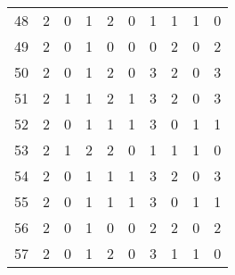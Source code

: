 \begin{longtable}{cp{1.5cm}p{1.5cm}p{1.5cm}p{1.5cm}p{1.5cm}p{1.5cm}p{1.5cm}p{1.5cm}p{1.5cm}}
48 &                      2 &                      0 &                      1 &                         2 &                         0 &                         1 &                      1 &                      1 &                      0 \\
49 &                      2 &                      0 &                      1 &                         0 &                         0 &                         0 &                      2 &                      0 &                      2 \\
50 &                      2 &                      0 &                      1 &                         2 &                         0 &                         3 &                      2 &                      0 &                      3 \\
51 &                      2 &                      1 &                      1 &                         2 &                         1 &                         3 &                      2 &                      0 &                      3 \\
52 &                      2 &                      0 &                      1 &                         1 &                         1 &                         3 &                      0 &                      1 &                      1 \\
53 &                      2 &                      1 &                      2 &                         2 &                         0 &                         1 &                      1 &                      1 &                      0 \\
54 &                      2 &                      0 &                      1 &                         1 &                         1 &                         3 &                      2 &                      0 &                      3 \\
55 &                      2 &                      0 &                      1 &                         1 &                         1 &                         3 &                      0 &                      1 &                      1 \\
56 &                      2 &                      0 &                      1 &                         0 &                         0 &                         2 &                      2 &                      0 &                      2 \\
57 &                      2 &                      0 &                      1 &                         2 &                         0 &                         3 &                      1 &                      1 &                      0 \\

\end{longtable}
